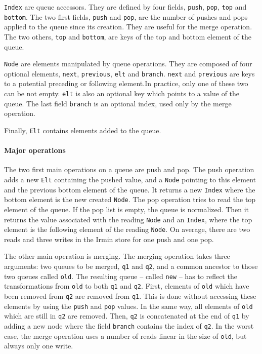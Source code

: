 \documentclass{article}
\newcommand{\irmin}{Irmin\xspace}
\newcommand{\code}[1]{\texttt{#1}}
\begin{document}
\code{Index} are queue accessors.
They are defined by four fields, \code{push}, \code{pop}, \code{top} and \code{bottom}.
The two first fields, \code{push} and \code{pop}, are the number of pushes and pops applied to the queue since its creation.
They are useful for the merge operation.
The two others, \code{top} and \code{bottom}, are keys of the top and bottom element of the queue.

\code{Node} are elements manipulated by queue operations.
They are composed of four optional elements, \code{next}, \code{previous}, \code{elt} and \code{branch}. \code{next} and \code{previous} are keys to a potential preceding or following element.In practice, only one of these two can be not empty. \code{elt} is also an optional key which points to a value of the queue. The last field \code{branch} is an optional index, used only by the merge operation.

Finally, \code{Elt} contains elements added to the queue.


\paragraph{Major operations}
The two first main operations on a queue are push and pop.
The push operation adds a new \code{Elt} containing the pushed value, and a \code{Node} pointing to this element and the previous bottom element of the queue.
It returns a new \code{Index} where the bottom element is the new created \code{Node}.
The pop operation tries to read the top element of the queue.
If the pop list is empty, the queue is normalized.
Then it returns the value associated with the reading \code{Node} and an \code{Index}, where the top element is the following element of the reading \code{Node}.
On average, there are two reads and three writes in the \irmin store for one push and one pop.

The other main operation is merging.
The merging operation takes three arguments: two queues to be merged, \code{q1} and \code{q2}, and a common ancestor to those two queues called \code{old}.
The resulting queue -- called \code{new} -- has to reflect the transformations from \code{old} to both \code{q1} and \code{q2}.
First, elements of \code{old} which have been removed from \code{q2} are removed from \code{q1}.
This is done without accessing these elements by using the \code{push} and \code{pop} values.
In the same way, all elements of \code{old} which are still in \code{q2} are removed.
Then, \code{q2} is concatenated at the end of \code{q1} by adding a new node where the field \code{branch} contains the index of \code{q2}.
In the worst case, the merge operation uses a number of reads linear in the size of \code{old}, but always only one write.
\end{document}
